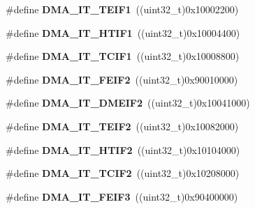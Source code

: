 \begin{DoxyCompactItemize}
\#define {\bfseries D\+M\+A\+\_\+\+I\+T\+\_\+\+T\+E\+I\+F1}~((uint32\+\_\+t)0x10002200)
\item 
\mbox{\label{group___d_m_a__interrupts__definitions_ga22e9fbbe3bd5539bf4c087c9ba2735da}} 
\#define {\bfseries D\+M\+A\+\_\+\+I\+T\+\_\+\+H\+T\+I\+F1}~((uint32\+\_\+t)0x10004400)
\item 
\mbox{\label{group___d_m_a__interrupts__definitions_gae4eb128c7b47473cf984c4d91878d879}} 
\#define {\bfseries D\+M\+A\+\_\+\+I\+T\+\_\+\+T\+C\+I\+F1}~((uint32\+\_\+t)0x10008800)
\item 
\mbox{\label{group___d_m_a__interrupts__definitions_gaeae384e9af7db044cf93e7f270eddd7c}} 
\#define {\bfseries D\+M\+A\+\_\+\+I\+T\+\_\+\+F\+E\+I\+F2}~((uint32\+\_\+t)0x90010000)
\item 
\mbox{\label{group___d_m_a__interrupts__definitions_ga56f547c35fcac83518aec320f0e38000}} 
\#define {\bfseries D\+M\+A\+\_\+\+I\+T\+\_\+\+D\+M\+E\+I\+F2}~((uint32\+\_\+t)0x10041000)
\item 
\mbox{\label{group___d_m_a__interrupts__definitions_ga8faa8c4705525ad1cd90290c5a04c589}} 
\#define {\bfseries D\+M\+A\+\_\+\+I\+T\+\_\+\+T\+E\+I\+F2}~((uint32\+\_\+t)0x10082000)
\item 
\mbox{\label{group___d_m_a__interrupts__definitions_ga759d12e1158b37391b31a79f3a54339c}} 
\#define {\bfseries D\+M\+A\+\_\+\+I\+T\+\_\+\+H\+T\+I\+F2}~((uint32\+\_\+t)0x10104000)
\item 
\mbox{\label{group___d_m_a__interrupts__definitions_ga04ed284cd063df3e1e72a189bc6d9d86}} 
\#define {\bfseries D\+M\+A\+\_\+\+I\+T\+\_\+\+T\+C\+I\+F2}~((uint32\+\_\+t)0x10208000)
\item 
\mbox{\label{group___d_m_a__interrupts__definitions_ga93483a72ed43feb6e5f4392bb2ac9851}} 
\#define {\bfseries D\+M\+A\+\_\+\+I\+T\+\_\+\+F\+E\+I\+F3}~((uint32\+\_\+t)0x90400000)
\item 

\end{DoxyCompactItemize}
